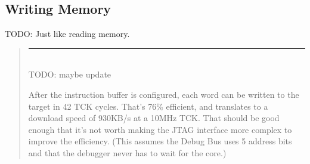 \documentclass{article}
\newenvironment{commentary}
{
   \begin{quotation}
   \noindent
   \small \em
   \rule{\linewidth}{1pt}\\
}
{
   \end{quotation}
}
\begin{document}
\begin{table}[htp]
\begin{tabulary}{\textwidth}{|r|l|L|}
        \hline
    \end{tabulary}
\end{table}

\subsection{Writing Memory} \label{writemem}

TODO: Just like reading memory.

\begin{commentary}

    TODO: maybe update

    After the instruction buffer is configured, each word can be written to the
    target in 42 TCK cycles. That's 76\% efficient, and translates to a
    download speed of 930KB/s at a 10MHz TCK.  That should be good enough that
    it's not worth making the JTAG interface more complex to improve the
    efficiency. (This assumes the Debug Bus uses 5 address bits and that the
    debugger never has to wait for the core.)
\end{commentary}
\end{document}
